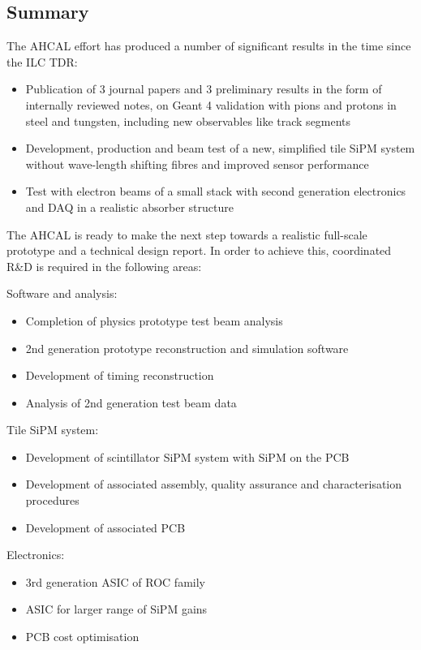 \subsection{Summary}
The AHCAL effort has produced a number of significant results in the time since the ILC TDR: 
\begin{itemize}
\item Publication of 3 journal papers and 3 preliminary results in the form of internally reviewed notes, on Geant 4 validation with pions and protons in steel and tungsten, including new observables like track segments
\item Development, production and beam test of a new, simplified tile SiPM system without wave-length shifting fibres and improved sensor performance
\item Test with electron beams of a small stack with second generation electronics and DAQ in a realistic absorber structure
\end{itemize}

The AHCAL is ready to make the next step towards a realistic full-scale prototype and a technical design report. In order to achieve this, coordinated R\&D is required in the following areas:

Software and analysis:
\begin{itemize}
\item Completion of physics prototype test beam analysis 
\item 2nd generation prototype reconstruction and simulation software
\item Development of timing reconstruction
\item Analysis of 2nd generation test beam data 
\end{itemize}

Tile SiPM system:
\begin{itemize}
\item Development of scintillator SiPM system with SiPM on the PCB
\item Development of associated assembly, quality assurance and characterisation procedures
\item Development of associated PCB
\end{itemize}

Electronics:
\begin{itemize}
\item 3rd generation ASIC of ROC family
\item ASIC for larger range of SiPM gains
\item PCB cost optimisation 
\end{itemize}


